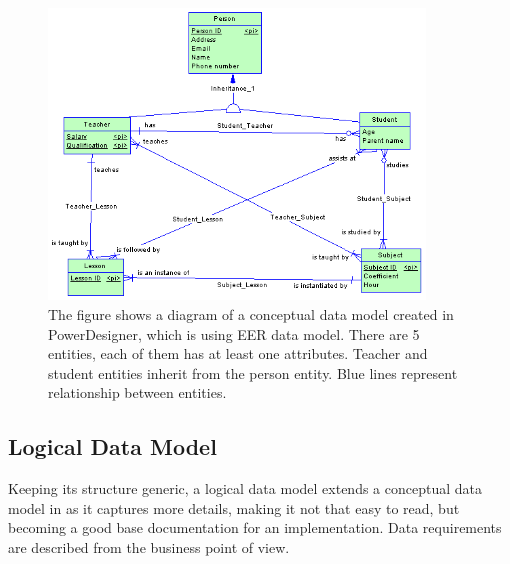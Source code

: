 \begin{figure}[H]
	\centering
	\includegraphics[width=10cm]{../img/Conceptual_Model_PowerDesigner}
	\caption[Conceptual diagram\cite{PowerDesignerDocumentation}]{The figure shows a diagram of a conceptual data model created in PowerDesigner, which is using EER data model. There are 5 entities, each of them has at least one attributes. Teacher and student entities inherit from the person entity. Blue lines represent relationship between entities.}
	\label{CDM}
\end{figure}

\subsection{Logical Data Model}

Keeping its structure generic, a logical data model extends a conceptual data model in as it captures more details, making it not that easy to read, but becoming a good base documentation for an implementation. Data requirements are described from the business point of view.

